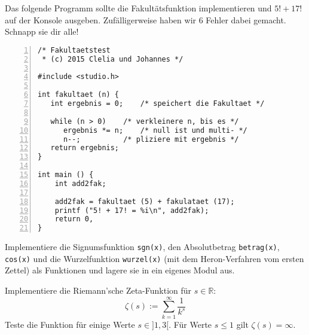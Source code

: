 \documentclass{uebungszettel}
\begin{document}
\begin{aufg}
Das folgende Programm sollte die Fakult\"atsfunktion implementieren
und $5! + 17!$ auf der Konsole ausgeben.
Zuf\"alligerweise haben wir $6$ Fehler dabei gemacht.
Schnapp sie dir alle! 

\begin{codelisting}
\begin{lstlisting}[numbers=left,numberstyle=\tiny,frame=tlrb,showstringspaces=false]
/* Fakultaetstest 
 * (c) 2015 Clelia und Johannes */

#include <studio.h>

int fakultaet (n) {
   int ergebnis = 0;    /* speichert die Fakultaet */
	
   while (n > 0) 	/* verkleinere n, bis es */
      ergebnis *= n;    /* null ist und multi- */
      n--;	        /* pliziere mit ergebnis */
   return ergebnis;
}

int main () {
	int add2fak;

	add2fak = fakultaet (5) + fakulataet (17);
	printf ("5! + 17! = %i\n", add2fak);
	return 0,
}
\end{lstlisting}
\end{codelisting}
\end{aufg}

\begin{aufg}
Implementiere die Signumsfunktion \verb|sgn(x)|, den Absolutbetrag \verb|betrag(x)|, \verb|cos(x)| und die Wurzelfunktion \verb|wurzel(x)| (mit dem Heron-Verfahren vom ersten Zettel) als Funktionen und lagere sie in ein eigenes Modul aus.
\end{aufg}

\begin{aufg}
Implementiere die Riemann'sche Zeta-Funktion für $s \in \mathbb R$: $$
\zeta(s) := \sum_{k=1}^\infty \frac{1}{k^s} $$
Teste die Funktion für einige Werte $s \in ] 1, 3 [$. Für Werte $s \leq 1$
gilt $\zeta(s) = \infty$.
\end{aufg}
\end{document}
